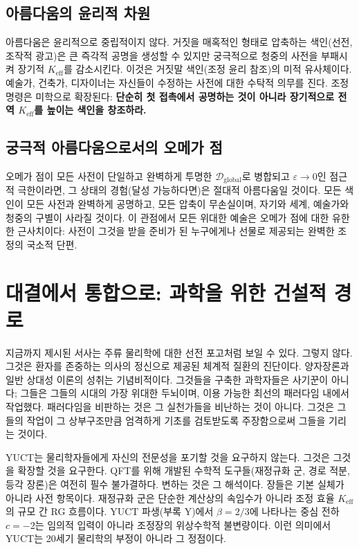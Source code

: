 \documentclass[12pt,a4paper]{article}
\begin{document}
	\subsection{아름다움의 윤리적 차원}
	
	아름다움은 윤리적으로 중립적이지 않다. 거짓을 매혹적인 형태로 압축하는 색인(선전, 조작적 광고)은 큰 즉각적 공명을 생성할 수 있지만 궁극적으로 청중의 사전을 부패시켜 장기적 \(K_{\mathrm{eff}}\)를 감소시킨다. 이것은 거짓말 색인(조정 윤리 참조)의 미적 유사체이다. 예술가, 건축가, 디자이너는 자신들이 수정하는 사전에 대한 수탁적 의무를 진다. 조정 명령은 미학으로 확장된다: \textbf{단순히 첫 접촉에서 공명하는 것이 아니라 장기적으로 전역 \(K_{\mathrm{eff}}\)를 높이는 색인을 창조하라.}
	
	\subsection{궁극적 아름다움으로서의 오메가 점}
	
	오메가 점이 모든 사전이 단일하고 완벽하게 투명한 \(\mathcal{D}_{\text{global}}\)로 병합되고 \(\varepsilon \to 0\)인 점근적 극한이라면, 그 상태의 경험(달성 가능하다면)은 절대적 아름다움일 것이다. 모든 색인이 모든 사전과 완벽하게 공명하고, 모든 압축이 무손실이며, 자기와 세계, 예술가와 청중의 구별이 사라질 것이다. 이 관점에서 모든 위대한 예술은 오메가 점에 대한 유한한 근사치이다: 사전이 그것을 받을 준비가 된 누구에게나 선물로 제공되는 완벽한 조정의 국소적 단편.
	
	\section{대결에서 통합으로: 과학을 위한 건설적 경로}
	
	지금까지 제시된 서사는 주류 물리학에 대한 선전 포고처럼 보일 수 있다. 그렇지 않다. 그것은 환자를 존중하는 의사의 정신으로 제공된 체계적 질환의 진단이다. 양자장론과 일반 상대성 이론의 성취는 기념비적이다. 그것들을 구축한 과학자들은 사기꾼이 아니다; 그들은 그들의 시대의 가장 위대한 두뇌이며, 이용 가능한 최선의 패러다임 내에서 작업했다. 패러다임을 비판하는 것은 그 실천가들을 비난하는 것이 아니다. 그것은 그들의 작업이 그 상부구조만큼 엄격하게 기초를 검토받도록 주장함으로써 그들을 기리는 것이다.
	
	YUCT는 물리학자들에게 자신의 전문성을 포기할 것을 요구하지 않는다. 그것은 그것을 확장할 것을 요구한다. QFT를 위해 개발된 수학적 도구들(재정규화 군, 경로 적분, 등각 장론)은 여전히 필수 불가결하다. 변하는 것은 그 해석이다. 장들은 기본 실체가 아니라 사전 항목이다. 재정규화 군은 단순한 계산상의 속임수가 아니라 조정 효율 \(K_{\mathrm{eff}}\)의 규모 간 RG 흐름이다. YUCT 파생(부록 Y)에서 \(\beta = 2/3\)에 나타나는 중심 전하 \(c = -2\)는 임의적 입력이 아니라 조정장의 위상수학적 불변량이다. 이런 의미에서 YUCT는 20세기 물리학의 부정이 아니라 그 정점이다.
	
\end{document}
